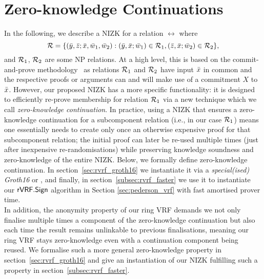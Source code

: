 
\newcommand{\handan}[2]{{\sout{#1}}\textcolor{blue}{#2}}

\newcommand{\qhandan}[2]{{\uline{#1}}\textcolor{pink}{(#2)}}

\section{Zero-knowledge Continuations}
\label{sec:rvrf_cont}

\noindent In the following, we describe a NIZK for a relation $\rel$ where
$$\mathcal{R} = \{(\bar{y}, \bar{z}; \bar{x}, \bar{w}_1, \bar{w}_2):  (\bar{y}, \bar{x}; \bar{w}_1) \in \mathcal{R}_1, (\bar{z}, \bar{x}; \bar{w}_2) \in \mathcal{R}_2 \},$$
and $\mathcal{R}_1$, $\mathcal{R}_2$ are some NP relations. 
At a high level, this is based on the commit-and-prove methodology~\cite{Kilian1990UsesOR,CLOS02,LegoSNARK} 
as relations $\mathcal{R}_1$ and $\mathcal{R}_2$ have input $\bar{x}$ in common and the respective 
proofs or arguments can and will make use of a commitment $X$ to $\bar{x}$. However, our proposed NIZK has a more specific functionality: 
it is designed to efficiently re-prove membership for relation $\mathcal{R}_1$ via a new technique which we call \emph{zero-knowledge continuation}. 
In practice, using a NIZK that ensures a zero-knowledge continuation for a 
subcomponent relation (i.e., in our case $\mathcal{R}_1$) means one essentially needs to create only once an otherwise expensive proof for that subcomponent 
relation; the initial proof can later be re-used multiple times (just after inexpensive re-randomisations) 
while preserving knowledge soundness and zero-knowledge of the entire NIZK. 
Below, we formally define zero-knowledge continuation. In section~\ref{sec:rvrf_groth16} we instantiate it via a \emph{special(ised) 
Groth16} or \SpecialG, and finally, in section~\ref{subsec:rvrf_faster} we use it to instantiate our $ {\mathsf{rVRF}}.{\mathsf{Sign}} $ algorithm in Section \ref{sec:pederson_vrf} with fast amortised prover time. \\

\noindent In addition, the anonymity property of our ring VRF demands we not only finalise multiple times a component of the zero-knowledge 
continuation but also each time the result remains unlinkable to previous finalisations, meaning our ring VRF stays zero-knowledge 
even with a continuation component being reused. We formalise such a more general zero-knowledge property in 
section~\ref{sec:rvrf_groth16} and give an instantiation of our NIZK fulfilling such a property in section~\ref{subsec:rvrf_faster}. 


